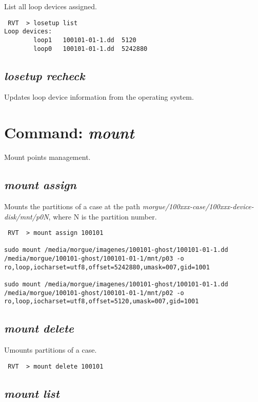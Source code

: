 \documentclass[a4paper,11pt,oneside]{report}
\begin{document}
List all loop devices assigned.

\begin{verbatim}
 RVT  > losetup list                                                          
Loop devices: 
        loop1   100101-01-1.dd  5120
        loop0   100101-01-1.dd  5242880
\end{verbatim}


\subsection*{\emph{losetup recheck}}

Updates loop device information from the operating system.


\section{Command: \emph{mount}}

Mount points management.

\subsection*{\emph{mount assign}}

Mounts the partitions of a case at the path \emph{morgue/100xxx-case/100xxx-device-disk/mnt/p0N}, where N is the partition number.

\begin{verbatim}
 RVT  > mount assign 100101

sudo mount /media/morgue/imagenes/100101-ghost/100101-01-1.dd /media/morgue/100101-ghost/100101-01-1/mnt/p03 -o ro,loop,iocharset=utf8,offset=5242880,umask=007,gid=1001

sudo mount /media/morgue/imagenes/100101-ghost/100101-01-1.dd /media/morgue/100101-ghost/100101-01-1/mnt/p02 -o ro,loop,iocharset=utf8,offset=5120,umask=007,gid=1001
\end{verbatim}


\subsection*{\emph{mount delete}}

Umounts partitions of a case.

\begin{verbatim}
 RVT  > mount delete 100101
\end{verbatim}


\subsection*{\emph{mount list}}
\end{document}
